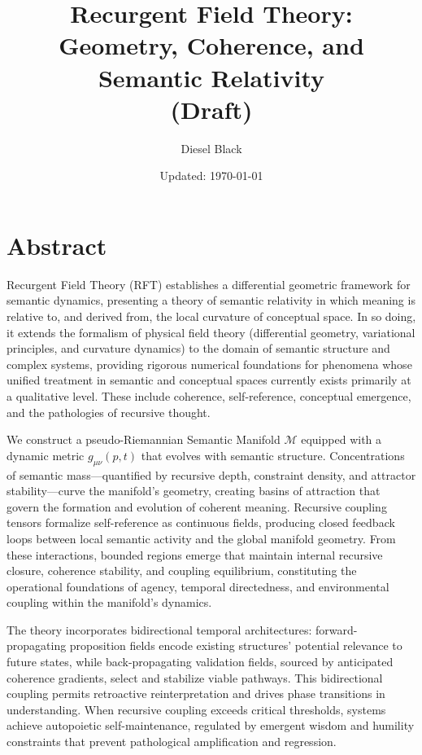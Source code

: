 \documentclass[11pt, a4paper]{report}
\title{Recurgent Field Theory: \\ Geometry, Coherence, and Semantic Relativity \\ \vspace{1em} \small{(Draft)}}
\author{Diesel Black}
\date{Updated: \today}
\begin{document}

\maketitle

\section*{Abstract}

Recurgent Field Theory (RFT) establishes a differential geometric framework for semantic dynamics, presenting a theory of semantic relativity in which meaning is relative to, and derived from, the local curvature of conceptual space. In so doing, it extends the formalism of physical field theory (differential geometry, variational principles, and curvature dynamics) to the domain of semantic structure and complex systems, providing rigorous numerical foundations for phenomena whose unified treatment in semantic and conceptual spaces currently exists primarily at a qualitative level. These include coherence, self-reference, conceptual emergence, and the pathologies of recursive thought.

We construct a pseudo-Riemannian Semantic Manifold \(\mathcal{M}\) equipped with a dynamic metric \(g_{\mu\nu}(p,t)\) that evolves with semantic structure. Concentrations of semantic mass—quantified by recursive depth, constraint density, and attractor stability—curve the manifold's geometry, creating basins of attraction that govern the formation and evolution of coherent meaning. Recursive coupling tensors formalize self-reference as continuous fields, producing closed feedback loops between local semantic activity and the global manifold geometry. From these interactions, bounded regions emerge that maintain internal recursive closure, coherence stability, and coupling equilibrium, constituting the operational foundations of agency, temporal directedness, and environmental coupling within the manifold's dynamics.

The theory incorporates bidirectional temporal architectures: forward-propagating proposition fields encode existing structures' potential relevance to future states, while back-propagating validation fields, sourced by anticipated coherence gradients, select and stabilize viable pathways. This bidirectional coupling permits retroactive reinterpretation and drives phase transitions in understanding. When recursive coupling exceeds critical thresholds, systems achieve autopoietic self-maintenance, regulated by emergent wisdom and humility constraints that prevent pathological amplification and regression.
\end{document}

